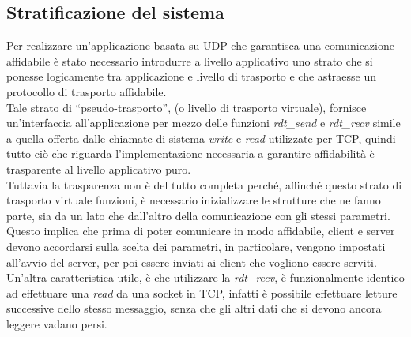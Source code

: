 \subsection{Stratificazione del sistema}
Per realizzare un'applicazione basata su UDP che garantisca una comunicazione 
affidabile è stato necessario introdurre a livello applicativo uno strato che
si ponesse logicamente tra applicazione e livello di trasporto e che astraesse
un protocollo di trasporto affidabile.\\
Tale strato di ``pseudo-trasporto'', (o livello di trasporto virtuale), fornisce un'interfaccia all'applicazione 
per mezzo delle funzioni \emph{rdt\_send} e \emph{rdt\_recv} simile a quella 
offerta dalle chiamate di sistema \emph{write} e \emph{read} utilizzate per TCP, 
quindi tutto ciò che riguarda l'implementazione necessaria a garantire 
affidabilità è trasparente al livello applicativo puro.\\
Tuttavia la trasparenza non è del tutto completa perché, affinché questo strato
di trasporto virtuale funzioni, è necessario inizializzare le strutture che ne 
fanno parte, sia da un lato che dall'altro della comunicazione con gli stessi 
parametri. Questo implica che prima di poter comunicare in modo affidabile, 
client e server devono accordarsi sulla scelta dei parametri, in particolare, 
vengono impostati all'avvio del server, per poi essere inviati ai client che 
vogliono essere serviti.\\
Un'altra caratteristica utile, è che utilizzare la \emph{rdt\_recv}, è 
funzionalmente identico ad effettuare una \emph{read} da una socket in TCP, 
infatti è possibile effettuare letture successive dello stesso messaggio, senza 
che gli altri dati che si devono ancora leggere vadano persi. 
